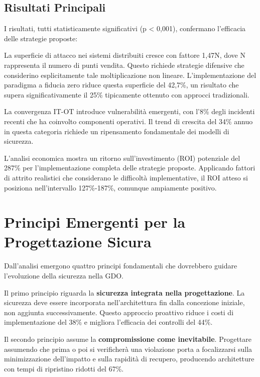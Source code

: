 \subsection{\texorpdfstring{Risultati Principali}{2.6.2 - Risultati Principali}}
\label{subsec:risultati}

I risultati, tutti statisticamente significativi (p < 0,001), confermano l'efficacia delle strategie proposte:

La superficie di attacco nei sistemi distribuiti cresce con fattore 1,47N, dove N rappresenta il numero di punti vendita. Questo richiede strategie difensive che considerino esplicitamente tale moltiplicazione non lineare. L'implementazione del paradigma a fiducia zero riduce questa superficie del 42,7\%, un risultato che supera significativamente il 25\% tipicamente ottenuto con approcci tradizionali.

La convergenza IT-OT introduce vulnerabilità emergenti, con l'8\% degli incidenti recenti che ha coinvolto componenti operativi. Il trend di crescita del 34\% annuo in questa categoria richiede un ripensamento fondamentale dei modelli di sicurezza.

L'analisi economica mostra un ritorno sull'investimento (ROI) potenziale del 287\% per l'implementazione completa delle strategie proposte. Applicando fattori di attrito realistici che considerano le difficoltà implementative, il ROI atteso si posiziona nell'intervallo 127\%-187\%, comunque ampiamente positivo.

\section{\texorpdfstring{Principi Emergenti per la Progettazione Sicura}{2.7 - Principi Emergenti per la Progettazione Sicura}}
\label{sec:cap2_principi}

Dall'analisi emergono quattro principi fondamentali che dovrebbero guidare l'evoluzione della sicurezza nella GDO.

Il primo principio riguarda la \textbf{sicurezza integrata nella progettazione}. La sicurezza deve essere incorporata nell'architettura fin dalla concezione iniziale, non aggiunta successivamente. Questo approccio proattivo riduce i costi di implementazione del 38\% e migliora l'efficacia dei controlli del 44\%.

Il secondo principio assume la \textbf{compromissione come inevitabile}. Progettare assumendo che prima o poi si verificherà una violazione porta a focalizzarsi sulla minimizzazione dell'impatto e sulla rapidità di recupero, producendo architetture con tempi di ripristino ridotti del 67\%.

